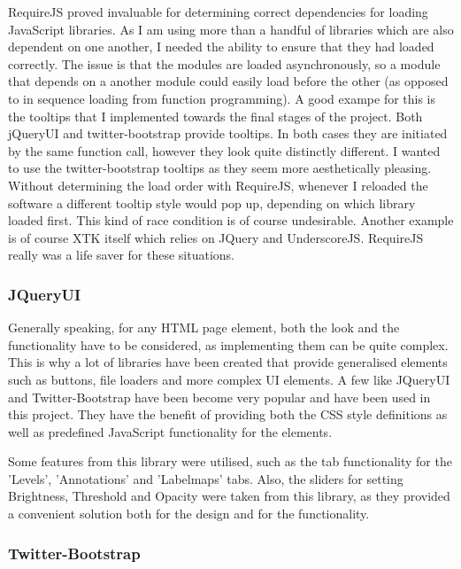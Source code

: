 \documentclass[a4paper,11pt,titlepage]{article}
\begin{document}
RequireJS proved invaluable for determining correct dependencies for loading JavaScript libraries.
As I am using more than a handful of libraries which are also dependent on one another, I needed the ability to ensure that they had loaded correctly. The issue is that the modules are loaded asynchronously, so a module that depends on a another module could easily load before the other (as opposed to in sequence loading from function programming). A good exampe for this is the tooltips that I implemented towards the final stages of the project. Both jQueryUI and twitter-bootstrap provide tooltips. In both cases they are initiated by the same function call, however they look quite distinctly different. I wanted to use the twitter-bootstrap tooltips as they seem more aesthetically pleasing. Without determining the load order with RequireJS, whenever I reloaded the software a different tooltip style would pop up, depending on which library loaded first. This kind of race condition is of course undesirable.
Another example is of course XTK itself which relies on JQuery and UnderscoreJS. RequireJS really was a life saver for these situations.






\subsubsection{JQueryUI}

Generally speaking, for any HTML page element, both the look and the functionality have to be considered, as implementing them can be quite complex. This is why a lot of libraries have been created that provide generalised elements such as buttons, file loaders and more complex UI elements. A few like JQueryUI and Twitter-Bootstrap have been become very popular and have been used in this project. They have the benefit of providing both the CSS style definitions as well as predefined JavaScript functionality for the elements. 

Some features from this library were utilised, such as the tab functionality for the 'Levels', 'Annotations' and 'Labelmaps' tabs. Also, the sliders for setting Brightness, Threshold and Opacity were taken from this library, as they provided a convenient solution both for the design and for the functionality.


\subsubsection{Twitter-Bootstrap}
\end{document}
